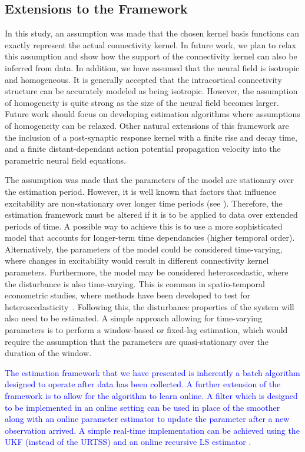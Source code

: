 \documentclass[review,authoryear,3p]{elsarticle}
\newcommand{\parham}[1]{\textcolor{blue}{#1}}
\begin{document}
\subsection{Extensions to the Framework}
In this study, an assumption was made that the chosen kernel basis functions can exactly represent the actual connectivity kernel. In future work, we plan to relax this assumption and show how the support of the connectivity kernel can also be inferred from data. In addition, we have assumed that the neural field is isotropic and homogeneous. It is generally accepted that the intracortical connectivity structure can be accurately modeled as being isotropic. However, the assumption of homogeneity is quite strong as the size of the neural field becomes larger. Future work should focus on developing estimation algorithms where assumptions of homogeneity can be relaxed. Other natural extensions of this framework are the inclusion of a post-synaptic response kernel with a finite rise and decay time, and a finite distant-dependant action potential propagation velocity into the parametric neural field equations. 

The assumption was made that the parameters of the model are stationary over the estimation period. However, it is well known that factors that influence excitability are non-stationary over longer time periods (see \citet{Ullah2010}). Therefore, the estimation framework must be altered if it is to be applied to data over extended periods of time. A possible way to achieve this is to use a more sophisticated model that accounts for longer-term time dependancies (higher temporal order). Alternatively, the parameters of the model could be considered time-varying, where changes in excitability would result in different connectivity kernel parameters. Furthermore, the model may be considered heteroscedastic, where the disturbance is also time-varying. This is common in spatio-temporal econometric studies, where methods have been developed to test for heteroscedasticity~\citep{Anselin1988}. Following this, the disturbance properties of the system will also need to be estimated. A simple approach allowing for time-varying parameters is to perform a window-based or fixed-lag estimation, which would require the assumption that the parameters are quasi-stationary over the duration of the window.

\parham{The estimation framework that we have presented is inherently a batch algorithm designed to operate after data has been collected. A further extension of the framework is to allow for the algorithm to learn online. A filter which is designed to be implemented in an online setting can be used in place of the smoother along with an online parameter estimator to update the parameter after a new observation arrived. A simple real-time implementation can be achieved using the UKF (instead of the URTSS) and an online recursive LS estimator \cite{Ljung1999}.}
\end{document}
